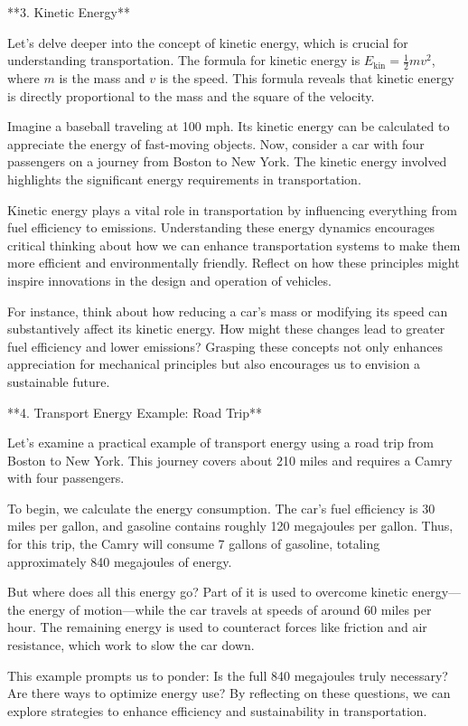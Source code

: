 \begin{tcolorbox}[size=title,opacityfill=0.05,breakable]
**3. Kinetic Energy**

Let's delve deeper into the concept of kinetic energy, which is crucial for understanding transportation. The formula for kinetic energy is \( E_{\text{kin}} = \frac{1}{2}mv^2 \), where \( m \) is the mass and \( v \) is the speed. This formula reveals that kinetic energy is directly proportional to the mass and the square of the velocity. 

Imagine a baseball traveling at 100 mph. Its kinetic energy can be calculated to appreciate the energy of fast-moving objects. Now, consider a car with four passengers on a journey from Boston to New York. The kinetic energy involved highlights the significant energy requirements in transportation.

Kinetic energy plays a vital role in transportation by influencing everything from fuel efficiency to emissions. Understanding these energy dynamics encourages critical thinking about how we can enhance transportation systems to make them more efficient and environmentally friendly. Reflect on how these principles might inspire innovations in the design and operation of vehicles.

For instance, think about how reducing a car's mass or modifying its speed can substantively affect its kinetic energy. How might these changes lead to greater fuel efficiency and lower emissions? Grasping these concepts not only enhances appreciation for mechanical principles but also encourages us to envision a sustainable future.

**4. Transport Energy Example: Road Trip**

Let's examine a practical example of transport energy using a road trip from Boston to New York. This journey covers about 210 miles and requires a Camry with four passengers. 

To begin, we calculate the energy consumption. The car's fuel efficiency is 30 miles per gallon, and gasoline contains roughly 120 megajoules per gallon. Thus, for this trip, the Camry will consume 7 gallons of gasoline, totaling approximately 840 megajoules of energy.

But where does all this energy go? Part of it is used to overcome kinetic energy—the energy of motion—while the car travels at speeds of around 60 miles per hour. The remaining energy is used to counteract forces like friction and air resistance, which work to slow the car down.

This example prompts us to ponder: Is the full 840 megajoules truly necessary? Are there ways to optimize energy use? By reflecting on these questions, we can explore strategies to enhance efficiency and sustainability in transportation.


\end{tcolorbox}
